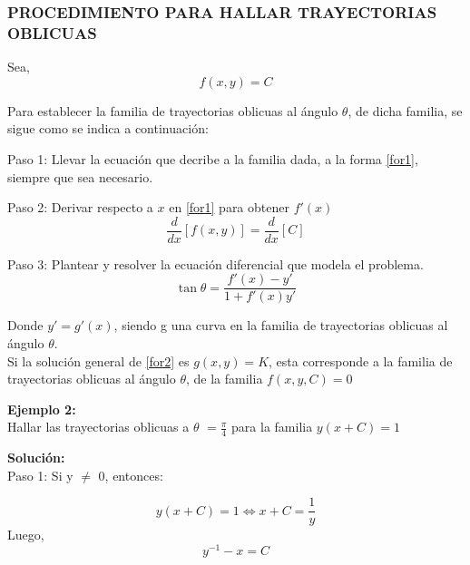 \documentclass[12pt,letterpaper]{article}
\begin{document}
\begin{titlepage}
\begin{flushleft}
\subsubsection{PROCEDIMIENTO PARA HALLAR TRAYECTORIAS OBLICUAS} 

Sea,
\begin{equation} \tag{1} \label{for1}
f(x,y) = C
\end{equation}

Para establecer la familia de trayectorias oblicuas al ángulo $\theta$, de dicha familia, se sigue como se indica a continuación:

\vspace{0.6cm}
Paso 1: Llevar la ecuación que decribe a la familia dada, a la forma \eqref{for1}, siempre que sea necesario.
\vspace{0.6cm}

Paso 2: Derivar respecto a $x$ en \eqref{for1} para obtener $f'(x)$
\begin{equation*}
\dfrac{d}{dx} [f(x,y)] = \dfrac{d}{dx}[C]
\end{equation*}

Paso 3: Plantear y resolver la ecuación diferencial que modela el problema.
\begin{equation} \tag{2} \label{for2}
\tan \theta = \frac{f'(x) - y'}{1+ f'(x)y'}
\end{equation}

Donde $y' = g'(x)$, siendo g una curva en la familia de trayectorias oblicuas al ángulo $\theta$.\\
\vspace{0.5 cm}
Si la solución general de \eqref{for2} es $g(x,y) = K$, esta corresponde a la familia de trayectorias oblicuas al ángulo $\theta$, de la familia $f(x,y,C) = 0$
\vspace{0.5cm}

\textbf{Ejemplo 2:}\\
\vspace{0.5cm}
Hallar las trayectorias oblicuas a $\theta$ $ = \frac{\pi}{4}$ para la familia $ y( x+C ) = 1 $ 

\textbf{Solución:} \\
\vspace{0.5cm}
Paso 1: Si y $\neq$ 0, entonces: 

\begin{equation} \tag{1} \label{forma1}
y( x+C ) = 1 \Leftrightarrow x + C = \frac{1}{y}
\end{equation}
Luego, 
\begin{equation} \tag{2} \label{forma2}
y^{-1} - x = C 
\end{equation}


\end{flushleft}
\end{titlepage}
\end{document}
